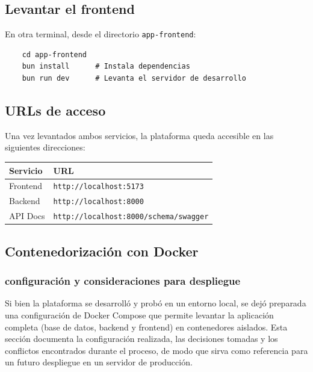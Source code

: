 \subsection*{Levantar el frontend}

En otra terminal, desde el directorio \texttt{app-frontend}:

\begin{lstlisting}
	cd app-frontend
	bun install      # Instala dependencias
	bun run dev      # Levanta el servidor de desarrollo
\end{lstlisting}

\subsection*{URLs de acceso}

Una vez levantados ambos servicios, la plataforma queda accesible en las siguientes
direcciones:

\begin{center}
	\begin{tabular}{ll}
		\hline
		\textbf{Servicio} & \textbf{URL} \\
		\hline
		Frontend  & \texttt{http://localhost:5173} \\
		Backend   & \texttt{http://localhost:8000} \\
		API Docs  & \texttt{http://localhost:8000/schema/swagger} \\
		\hline
	\end{tabular}
\end{center}

\subsection{Contenedorización con Docker}

\subsubsection*{configuración y consideraciones para despliegue}

Si bien la plataforma se desarrolló y probó en un entorno local, se dejó preparada una
configuración de Docker Compose que permite levantar la aplicación completa (base de datos,
backend y frontend) en contenedores aislados. Esta sección documenta la configuración
realizada, las decisiones tomadas y los conflictos encontrados durante el proceso, de modo que
sirva como referencia para un futuro despliegue en un servidor de producción.

